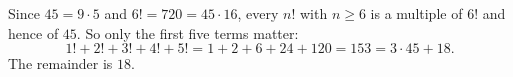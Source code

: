 Since $45=9\cdot5$ and $6!=720=45\cdot16$, every $n!$ with $n\ge6$ is a multiple of $6!$ and hence of $45$. So only the first five terms matter:
\[
1!+2!+3!+4!+5!=1+2+6+24+120=153=3\cdot45+18 .
\]
The remainder is $\boxed{18}$.
